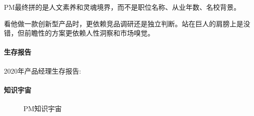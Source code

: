 \documentclass[letterpaper,11pt,english]{sphinxmanual}
\begin{document}
PM最终拼的是人文素养和灵魂境界，而不是职位名称、从业年数、名校背景。

看他做一款创新型产品时，更依赖竞品调研还是独立判断。站在巨人的肩膀上是没错，但前瞻性的方案更依赖人性洞察和市场嗅觉。


\paragraph{生存报告}
\label{\detokenize{chapter_introduction/PM:id64}}
2020年产品经理生存报告:


\paragraph{知识宇宙}
\label{\detokenize{chapter_introduction/PM:id65}}
\begin{figure}[H]
\centering
\capstart

\noindent{}
\caption{PM知识宇宙\sphinxfootnotemark[175]}\label{\detokenize{chapter_introduction/PM:id77}}\end{figure}
%
\begin{footnotetext}[175]\sphinxAtStartFootnote
{}
%
\end{footnotetext}\ignorespaces 
\end{document}

